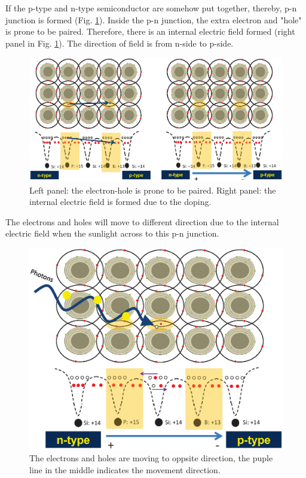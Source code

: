\documentclass[a4paper, 12pt, titlepage,oneside,drop]{kthesis}
\begin{document}
If the p-type and n-type semiconductor are somehow put together, thereby, p-n junction is formed (Fig. \ref{nptype2}). Inside the p-n junction, the extra electron and "hole" is prone to
be paired. Therefore, there is an internal electric field formed (right panel in Fig. \ref{nptype2}). The direction of field is from n-side to p-side. 

\begin{figure}[H]
\centering
\includegraphics[scale=.6]{nptype2}
\caption{Left panel: the electron-hole is prone to be paired. Right panel: the internal electric field is formed due to the doping.}
\label{nptype2}
\end{figure}


The electrons and holes will move to different direction due to the internal electric field when the sunlight across to this p-n junction.

\begin{figure}[H]
\centering
\includegraphics[scale=.4]{scr1}
\caption{The electrons and holes are moving to oppsite direction, the puple line in the middle indicates the movement direction.}
\label{scr1}
\end{figure}
\end{document}
